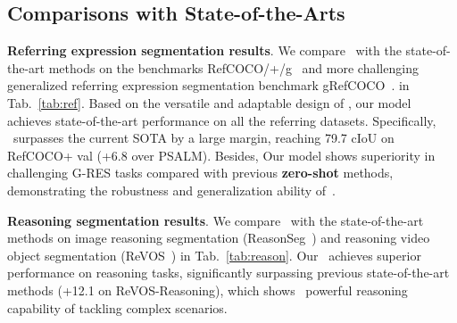 \begin{table}[t]
  \centering
  \caption{ Ablation on the core components of \name. 
  FVP and HER denote the proposed Fine-grained Visual Perceiver and Hybrid Entity Recognition modules.
  }
  
\label{tab:ab-component}
\end{table}

\subsection{Comparisons with State-of-the-Arts}

\noindent\textbf{Referring expression segmentation results}.
We compare \name~with the state-of-the-art methods on the benchmarks RefCOCO/+/g~\cite{yu2016modeling,nagaraja2016modeling} and more challenging generalized referring expression segmentation benchmark gRefCOCO~\cite{liu2023gres}. in Tab.~\ref{tab:ref}. Based on the versatile and adaptable design of \name, our model achieves state-of-the-art performance on all the referring datasets. Specifically, \name~surpasses the current SOTA by a large margin, reaching 79.7 cIoU on RefCOCO+ val (+6.8 over PSALM).
Besides, Our model shows superiority in challenging G-RES tasks compared with previous \textbf{zero-shot} methods, demonstrating the robustness and generalization ability of~\name.

\noindent\textbf{Reasoning segmentation results}.
We compare \name~with the state-of-the-art methods on image reasoning segmentation (ReasonSeg~\cite{Lai2023LISARS}) and reasoning video object segmentation (ReVOS~\cite{yan2024visa}) in Tab.~\ref{tab:reason}.
Our \name~achieves superior performance on reasoning tasks, significantly surpassing previous state-of-the-art methods (+12.1 on ReVOS-Reasoning), which shows \name~powerful reasoning capability of tackling complex scenarios.

